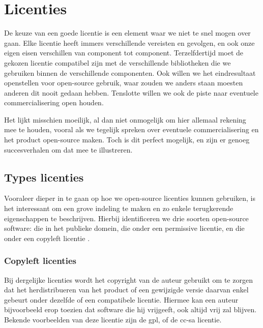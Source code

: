 \chapter{Licenties}
\label{ontwerp:licenties}

De keuze van een goede licentie is een element waar we niet te snel mogen over gaan. Elke licentie heeft immers verschillende vereisten en gevolgen, en ook onze eigen eisen verschillen van component tot component. Terzelfdertijd moet de gekozen licentie compatibel zijn met de verschillende bibliotheken die we gebruiken binnen de verschillende componenten. Ook willen we het eindresultaat openstellen voor open-source gebruik, waar zouden we anders staan moesten anderen dit nooit gedaan hebben. Tenslotte willen we ook de piste naar eventuele commercialisering open houden.

Het lijkt misschien moeilijk, al dan niet onmogelijk om hier allemaal rekening mee te houden, vooral als we tegelijk spreken over eventuele commercialisering en het product open-source maken. Toch is dit perfect mogelijk, en zijn er genoeg succesverhalen om dat mee te illustreren.

\section{Types licenties}
\label{ontwerp:licenties:type}

Vooraleer dieper in te gaan op hoe we open-source licenties kunnen gebruiken, is het interessant om een grove indeling te maken en zo enkele terugkerende eigenschappen te beschrijven. Hierbij identificeren we drie soorten open-source software: die in het publieke domein, die onder een permissive licentie, en die onder een copyleft licentie \citep{fsf:categories}.

\subsection{Copyleft licenties}
\label{ontwerp:licenties:type:copyleft}

Bij dergelijke licenties wordt het copyright van de auteur gebruikt om te zorgen dat het herdistribueren van het product of een gewijzigde versie daarvan enkel gebeurt onder dezelfde of een compatibele licentie. Hiermee kan een auteur bijvoorbeeld erop toezien dat software die hij vrijgeeft, ook altijd vrij zal blijven. Bekende voorbeelden van deze licentie zijn de \ac{gpl}, of de \ac{cc-sa} licentie.

